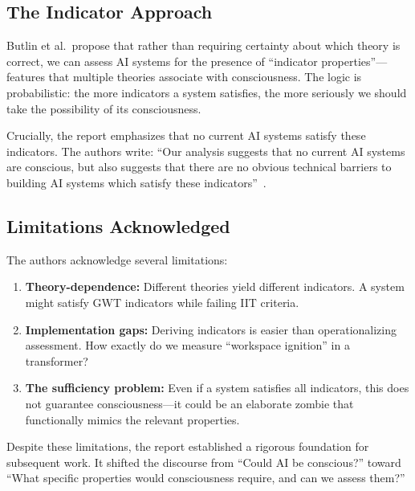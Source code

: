 \subsection{The Indicator Approach}

Butlin et al.\ propose that rather than requiring certainty about which theory is correct, we can assess AI systems for the presence of ``indicator properties''---features that multiple theories associate with consciousness. The logic is probabilistic: the more indicators a system satisfies, the more seriously we should take the possibility of its consciousness.

Crucially, the report emphasizes that no current AI systems satisfy these indicators. The authors write: ``Our analysis suggests that no current AI systems are conscious, but also suggests that there are no obvious technical barriers to building AI systems which satisfy these indicators''~\citep[p.~1]{butlin2023consciousness}.

\subsection{Limitations Acknowledged}

The authors acknowledge several limitations:

\begin{enumerate}
    \item \textbf{Theory-dependence:} Different theories yield different indicators. A system might satisfy GWT indicators while failing IIT criteria.

    \item \textbf{Implementation gaps:} Deriving indicators is easier than operationalizing assessment. How exactly do we measure ``workspace ignition'' in a transformer?

    \item \textbf{The sufficiency problem:} Even if a system satisfies all indicators, this does not guarantee consciousness---it could be an elaborate zombie that functionally mimics the relevant properties.
\end{enumerate}

Despite these limitations, the report established a rigorous foundation for subsequent work. It shifted the discourse from ``Could AI be conscious?'' toward ``What specific properties would consciousness require, and can we assess them?''

